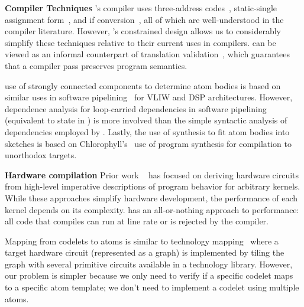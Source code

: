 \textbf{Compiler Techniques}
\pktlanguage's compiler uses three-address codes~\cite{tac}, static-single
assignment form~\cite{ssa}, and if conversion~\cite{if_conversion}, all of
which are well-understood in the compiler literature. However, \pktlanguage's
constrained design allows us to considerably simplify these techniques relative
to their current uses in compilers. \tester can be viewed as an informal
counterpart of translation validation~\cite{necula_translation_validation},
which guarantees that a compiler pass preserves program semantics.

\pktlanguage use of strongly connected components to determine atom bodies is
based on similar uses in software pipelining~\cite{software_pipelining} for
VLIW and DSP architectures. However, dependence analysis for loop-carried
dependencies in software pipelining (equivalent to state in \pktlanguage) is
more involved than the simple syntactic analysis of dependencies employed by
\pktlanguage. Lastly, the use of synthesis to fit atom bodies into sketches is
based on Chlorophyll's~\cite{chlorophyll} use of program synthesis for
compilation to unorthodox targets.

\textbf{Hardware compilation}
Prior work ~\cite{nurvadathi, cash, bluespec} has focused on deriving hardware
circuits from high-level imperative descriptions of program behavior for
arbitrary kernels. While these approaches simplify hardware development, the
performance of each kernel depends on its complexity.  \pktlanguage has an
all-or-nothing approach to performance: all code that compiles can run at
line rate or is rejected by the compiler.

Mapping from codelets to atoms is similar to technology mapping~\cite{micheli,
flowmap, spectransform} where a target hardware circuit (represented as a
graph) is implemented by tiling the graph with several primitive circuits
available in a technology library. However, our problem is simpler because we
only need to verify if a specific codelet maps to a specific atom template; we
don't need to implement a codelet using multiple atoms.
